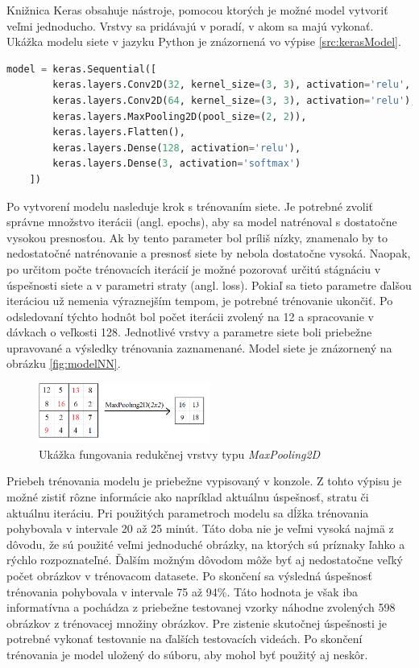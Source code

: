 \documentclass[slovak,master,dept460,male,cpp,cpdeclaration]{diploma}
\begin{document}
Knižnica Keras obsahuje nástroje, pomocou ktorých je možné model vytvoriť veľmi jednoducho. Vrstvy sa pridávajú v poradí, v akom sa majú vykonať. Ukážka modelu siete v jazyku Python je znázornená vo výpise \ref{src:kerasModel}.

\newpage
\begin{lstlisting}[language=Python,label=src:kerasModel,caption={Vrstvy neurónovej siete}]
    model = keras.Sequential([
        keras.layers.Conv2D(32, kernel_size=(3, 3), activation='relu', input_shape=(size, size, 1)),
        keras.layers.Conv2D(64, kernel_size=(3, 3), activation='relu'),
        keras.layers.MaxPooling2D(pool_size=(2, 2)),
        keras.layers.Flatten(),
        keras.layers.Dense(128, activation='relu'),
        keras.layers.Dense(3, activation='softmax')
    ])
\end{lstlisting}

Po vytvorení modelu nasleduje krok s trénovaním siete. Je potrebné zvoliť  správne množstvo iterácii (angl. epochs), aby sa model natrénoval s dostatočne vysokou presnosťou. Ak by tento parameter bol príliš nízky, znamenalo by to nedostatočné natrénovanie a presnosť siete by nebola dostatočne vysoká. Naopak, po určitom počte trénovacích iterácií je možné pozorovať určitú stágnáciu v úspešnosti siete a v  parametri straty (angl. loss).  Pokiaľ sa  tieto parametre ďalšou iteráciou už nemenia výraznejším tempom, je potrebné trénovanie ukončiť. Po odsledovaní týchto hodnôt bol počet iterácii zvolený na 12 a spracovanie v dávkach o veľkosti 128. Jednotlivé vrstvy a parametre siete boli priebežne upravované a výsledky trénovania zaznamenané. Model siete je znázornený na obrázku \ref{fig:modelNN}.

\begin{figure}[H]
	\centering
	\includegraphics[width=0.5\textwidth]{Figures/pooling.png}
	\caption{Ukážka fungovania redukčnej vrstvy typu \textit{MaxPooling2D}}
	\label{fig:pooling}
\end{figure}

Priebeh trénovania modelu je priebežne vypisovaný v konzole. Z tohto výpisu je možné zistiť rôzne informácie ako napríklad aktuálnu úspešnosť, stratu či aktuálnu iteráciu.  Pri použitých parametroch modelu sa dĺžka trénovania pohybovala v intervale 20 až 25 minút. Táto doba nie je veľmi vysoká najmä z dôvodu, že sú použité veľmi jednoduché obrázky, na ktorých sú príznaky ľahko a rýchlo rozpoznateľné. Ďalším možným dôvodom môže byť aj nedostatočne veľký počet obrázkov v trénovacom datasete. Po skončení sa  výsledná úspešnosť  trénovania pohybovala v intervale 75 až 94\%. Táto hodnota je však iba informatívna a pochádza z priebežne testovanej vzorky náhodne zvolených 598 obrázkov z trénovacej množiny obrázkov. Pre zistenie skutočnej úspešnosti je potrebné vykonať testovanie na ďalších testovacích videách. Po skončení trénovania je model uložený do  súboru, aby mohol byť  použitý aj neskôr. 
\end{document}
